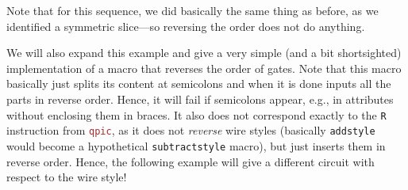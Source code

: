 \documentclass{scrartcl}
\makeatletter
\newenvironment{codeexample*}{%
   \VerbatimEnvironment%
   \let\FVB@VerbatimOut\minted@FVB@VerbatimOut
   \let\FVE@VerbatimOut\minted@FVE@VerbatimOut
   \minted@configlang{tex}%
   \minted@fvset
   \begin{VerbatimOut}[codes={\catcode`\^^I=12},firstline,lastline]{\minted@jobname.pyg}%
}{
   \end{VerbatimOut}%
   \minted@langlinenoson%
   \begin{adjustbox}{center}
       \minted@jobname.pyg %
   \end{adjustbox}\nopagebreak
   \expandafter\minted@pygmentize\expandafter{\minted@lang}%
   \minted@langlinenosoff%
   \par%
}
\def\pkg#1{\textcolor{brown}{\texttt{#1}}}
\def\ttlink{\link\texttt}
\makeatother
\begin{document}
            \begin{example}
               \begin{codeexample*}
               \end{codeexample*}
               Note that for this sequence, we did basically the same thing as before, as we identified a symmetric slice---so reversing the order does not do anything.

               We will also expand this example and give a very simple (and a bit shortsighted) implementation of a macro that reverses the order of gates.
               Note that this macro basically just splits its content at semicolons and when it is done inputs all the parts in reverse order.
               Hence, it will fail if semicolons appear, e.g., in attributes without enclosing them in braces.
               It also does not correspond exactly to the \texttt{R} instruction from \pkg{qpic}, as it does not \emph{reverse} wire styles (basically \ttlink{addstyle} would become a hypothetical \texttt{subtractstyle} macro), but just inserts them in reverse order.
               Hence, the following example will give a different circuit with respect to the wire style!


\end{example}
\end{document}
